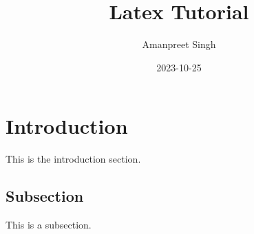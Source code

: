 \documentclass{article}
\title{Latex Tutorial}
\date{2023-10-25}
\author{Amanpreet Singh}
\begin{document}
  \maketitle %
  \newpage %

\section{Introduction}
This is the introduction section.
\subsection{Subsection}
This is a subsection.  
\end{document}
